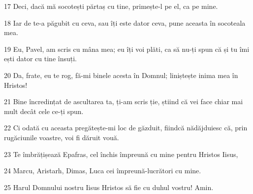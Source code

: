 \par 17 Deci, dacă mă socotești părtaș cu tine, primește-l pe el, ca pe mine.
\par 18 Iar de te-a păgubit cu ceva, sau îți este dator ceva, pune aceasta în socoteala mea.
\par 19 Eu, Pavel, am scris cu mâna mea; eu îți voi plăti, ca să nu-ți spun că și tu îmi ești dator cu tine însuți.
\par 20 Da, frate, eu te rog, fă-mi binele acesta în Domnul; liniștește inima mea în Hristos!
\par 21 Bine încredințat de ascultarea ta, ți-am scris ție, știind că vei face chiar mai mult decât cele ce-ți spun.
\par 22 Ci odată cu aceasta pregătește-mi loc de găzduit, fiindcă nădăjduiesc că, prin rugăciunile voastre, voi fi dăruit vouă.
\par 23 Te îmbrățișează Epafras, cel închis împreună cu mine pentru Hristos Iisus,
\par 24 Marcu, Aristarh, Dimas, Luca cei împreună-lucrători cu mine.
\par 25 Harul Domnului nostru Iisus Hristos să fie cu duhul vostru! Amin.


